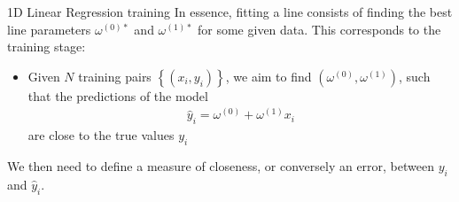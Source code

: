 \begin{parag}{1D Linear Regression training}
	In essence, fitting a line consists of finding the best line parameters $\omega^{\left(0\right)\ast}$ and $\omega^{\left(1\right)\ast}$ for some given data. This corresponds to the training stage:
	\begin{itemize}
		\item Given $N$ training pairs $\left\{\left(x_i, y_i\right)\right\}$, we aim to find $\left(\omega^{\left(0\right)}, \omega^{\left(1\right)}\right)$, such that the predictions of the model 
			\begin{align*} \hat{y}_i = \omega^{\left(0\right)} + \omega^{\left(1\right)}x_i \end{align*}
			are close to the true values $y_i$
	\end{itemize}
	We then need to define a measure of closeness, or conversely an error, between $y_i$ and $\hat{y}_i$.
	

\end{parag}
